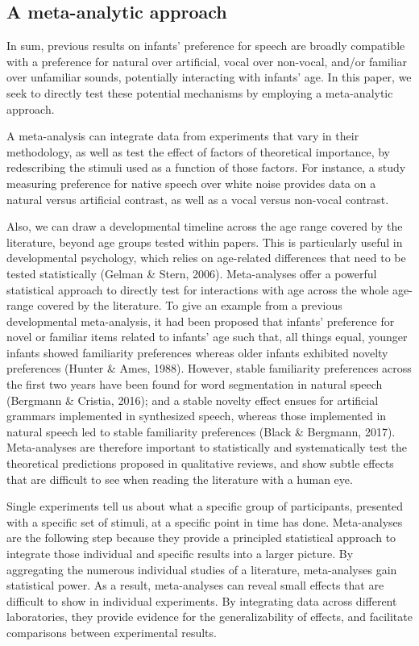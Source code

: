 \documentclass[
  english,
  man]{apa6}
\begin{document}
\hypertarget{a-meta-analytic-approach}{%
\subsection{A meta-analytic approach}\label{a-meta-analytic-approach}}

In sum, previous results on infants' preference for speech are broadly compatible with a preference for natural over artificial, vocal over non-vocal, and/or familiar over unfamiliar sounds, potentially interacting with infants' age. In this paper, we seek to directly test these potential mechanisms by employing a meta-analytic approach.

A meta-analysis can integrate data from experiments that vary in their methodology, as well as test the effect of factors of theoretical importance, by redescribing the stimuli used as a function of those factors. For instance, a study measuring preference for native speech over white noise provides data on a natural versus artificial contrast, as well as a vocal versus non-vocal contrast.

Also, we can draw a developmental timeline across the age range covered by the literature, beyond age groups tested within papers. This is particularly useful in developmental psychology, which relies on age-related differences that need to be tested statistically (Gelman \& Stern, 2006). Meta-analyses offer a powerful statistical approach to directly test for interactions with age across the whole age-range covered by the literature. To give an example from a previous developmental meta-analysis, it had been proposed that infants' preference for novel or familiar items related to infants' age such that, all things equal, younger infants showed familiarity preferences whereas older infants exhibited novelty preferences (Hunter \& Ames, 1988). However, stable familiarity preferences across the first two years have been found for word segmentation in natural speech (Bergmann \& Cristia, 2016); and a stable novelty effect ensues for artificial grammars implemented in synthesized speech, whereas those implemented in natural speech led to stable familiarity preferences (Black \& Bergmann, 2017). Meta-analyses are therefore important to statistically and systematically test the theoretical predictions proposed in qualitative reviews, and show subtle effects that are difficult to see when reading the literature with a human eye.

Single experiments tell us about what a specific group of participants, presented with a specific set of stimuli, at a specific point in time has done. Meta-analyses are the following step because they provide a principled statistical approach to integrate those individual and specific results into a larger picture. By aggregating the numerous individual studies of a literature, meta-analyses gain statistical power. As a result, meta-analyses can reveal small effects that are difficult to show in individual experiments. By integrating data across different laboratories, they provide evidence for the generalizability of effects, and facilitate comparisons between experimental results.
\end{document}
